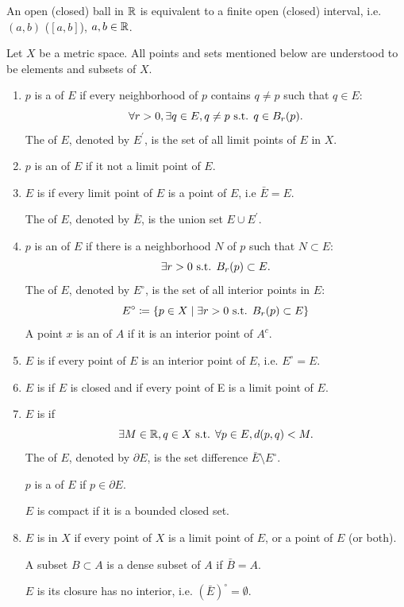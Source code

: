 \begin{example}
An open (closed) ball in $\mathbb R$ is equivalent to a finite open (closed) interval, i.e. $(a,b)$ ($[a,b]$), $a,b\in\mathbb R$.
\end{example}

\begin{definition}
Let $X$ be a metric space. All points and sets mentioned below are understood to be elements and subsets of $X$.
\begin{enumerate}[label=(\arabic*)]
\item $p$ is a  of $E$ if every neighborhood of $p$ contains $q\neq p$ such that $q\in E$:
\[ \forall r>0,\exists q\in E, q\neq p\text{ s.t. } q\in B_r(p). \]
The  of $E$, denoted by $E^\prime$, is the set of all limit points of $E$ in $X$.
\item $p$ is an  of $E$ if it not a limit point of $E$.
\item $E$ is  if every limit point of $E$ is a point of $E$, i.e $\bar{E}=E$.

The  of $E$, denoted by $\bar{E}$, is the union set $E\cup E^\prime$.

\item $p$ is an  of $E$ if there is a neighborhood $N$ of $p$ such that $N\subset E$:
\[ \exists r>0 \text{ s.t. } B_r(p)\subset E. \]
The  of $E$, denoted by $E^\circ$, is the set of all interior points in $E$:
\[E^\circ\coloneqq\{p\in X\mid \exists r>0 \text{ s.t. } B_r(p)\subset E\}\]
A point $x$ is an  of $A$ if it is an interior point of $A^c$.
\item $E$ is  if every point of $E$ is an interior point of $E$, i.e. $E^\circ=E$.
\item $E$ is  if $E$ is closed and if every point of E is a limit point of $E$.
\item $E$ is  if 
\[ \exists M\in\mathbb R, q\in X\text{ s.t. }\forall p\in E, d(p,q)<M. \]
The  of $E$, denoted by $\partial E$, is the set difference $\bar{E}\setminus E^\circ$.

$p$ is a  of $E$ if $p\in\partial E$.

$E$ is compact if it is a bounded closed set.
\item $E$ is  in $X$ if every point of $X$ is a limit point of $E$, or a point of $E$ (or both). 

A subset $B\subset A$ is a dense subset of $A$ if $\bar{B}=A$.

$E$ is  its closure has no interior, i.e. $(\bar{E})^\circ=\emptyset$.
\end{enumerate}
\end{definition}

